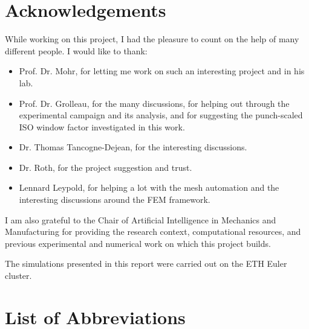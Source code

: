 \cleardoublepage


\chapter*{Acknowledgements}

While working on this project, I had the pleasure to count on the help of
many different people. I would like to thank:

\begin{itemize}
    \item Prof. Dr. Mohr, for letting me work on such an interesting project
    and in his lab.
    \item Prof. Dr. Grolleau, for the many discussions, for helping out
    through the experimental campaign and its analysis, and for suggesting
    the punch-scaled ISO window factor investigated in this work.
    \item Dr. Thomas Tancogne-Dejean, for the interesting discussions.
    \item Dr. Roth, for the project suggestion and trust.
    \item Lennard Leypold, for helping a lot with the mesh automation and the
    interesting discussions around the FEM framework.
\end{itemize}

I am also grateful to the Chair of Artificial Intelligence in Mechanics and
Manufacturing for providing the research context, computational resources,
and previous experimental and numerical work on which this project builds.

The simulations presented in this report were carried out on the ETH Euler
cluster.

\cleardoublepage


\setcounter{tocdepth}{2}
\tableofcontents

\cleardoublepage


\chapter*{List of Abbreviations}
\label{chap:abbreviations}

